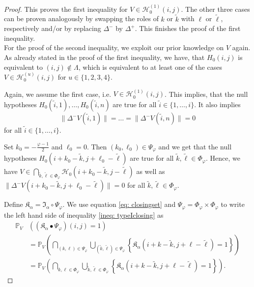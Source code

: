 \documentclass[a4paper,12pt]{article}
\newcommand{\norm}[1]{\lVert#1\rVert}
\theoremstyle{plain}
\theoremstyle{definition}
\begin{document}
\begin{proof}
	This proves the first inequality for $V \in \mathcal{H}_0^{(1)}(i, j)$. The other three cases can be proven analogously by swapping the roles of $k$ or $\tilde{k}$ with $\ell$ or $\tilde{\ell}$, respectively and/or by replacing $\Delta^-$ by $\Delta^+$. This finishes the proof of the first inequality.\\
	
	
	For the proof of the second inequality, we exploit our prior knowledge on $V$ again. As already stated in the proof of the first inequality, we have, that $H_0(i, j)$ is equivalent to $(i, j) \notin \varLambda$, which is equivalent to at least one of the cases $V \in \mathcal{H}_0^{(u)}(i, j)$ for $u \in \{ 1, 2, 3, 4 \}$.
	
	Again, we assume the first case, i.e. $V \in \mathcal{H}_0^{(1)}(i, j)$. This implies, that the null hypotheses $H_0(\tilde{i}, 1), \ldots, H_0(\tilde{i}, n)$ are true for all $\tilde{i} \in \{ 1, \dots, i \}$. It also implies
	\begin{equation*}
		\norm{\Delta^- V(\tilde{i}, 1)} = \ldots = \norm{\Delta^- V(\tilde{i}, n)} = 0
	\end{equation*}
	for all $\tilde{i} \in \{ 1, \dots, i \}$.
	
	Set $k_0 = -\frac{\varphi - 1}{2}$ and $\ell_0 = 0$. Then $(k_0, \ell_0) \in \Psi_\varphi$ and we get that the null hypotheses $H_0(i + k_0 - \tilde{k}, j + \ell_0 - \tilde{\ell})$ are true for all $\tilde{k}, \tilde{\ell} \in \Phi_\varphi$. Hence, we have $V \in \bigcap_{\tilde{k}, \tilde{\ell} \in \Phi_\varphi} \mathcal{H}_0(i + k_0 - \tilde{k}, j - \tilde{\ell})$ as well as $\norm{\Delta^- V(i + k_0 - \tilde{k}, j + \ell_0 - \tilde{\ell})} = 0$ for all $\tilde{k}, \tilde{\ell} \in \Phi_\varphi$.
	
	Define $\mathfrak{K}_\alpha = \mathfrak{I}_\alpha \circ \Psi_\varphi$. We use equation \eqref{eq: closingset} and $\Psi_\varphi = \Phi_\varphi \times \Phi_\varphi$ to write the left hand side of inequality \eqref{ineq: typeIclosing} as
	\begin{align*}
		\mathbb{P}_V&\left( (\mathfrak{K}_\alpha \bullet \Psi_\varphi)(i, j) = 1 \right) \\
		&= \mathbb{P}_V\left( \bigcap_{(k, \ell) \in \Psi_\varphi} \bigcup_{(\tilde{k}, \tilde{\ell}) \in \Psi_\varphi} \left\{ \mathfrak{K}_\alpha(i + k - \tilde{k}, j + \ell - \tilde{\ell}) = 1 \right\} \right) \\
		&= \mathbb{P}_V\left( \bigcap_{k, \ell \in \Phi_\varphi} \bigcup_{\tilde{k}, \tilde{\ell} \in \Phi_\varphi} \left\{ \mathfrak{K}_\alpha(i + k - \tilde{k}, j + \ell - \tilde{\ell}) = 1 \right\} \right).
	\end{align*}
	

\end{proof}
\end{document}
